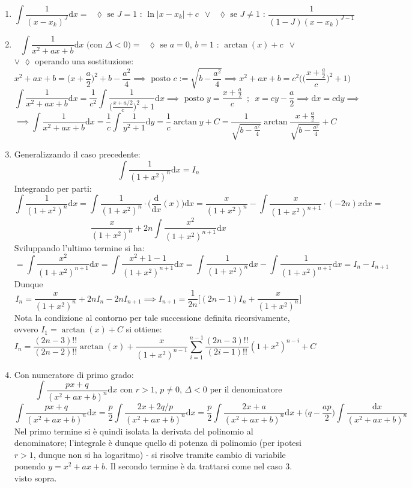 \documentclass[10pt, oneside]{book}
\theoremstyle{plain}
\begin{document}
\begin{enumerate}
    \item \[\int \frac{1}{(x - x_k)^J} \textrm{d}x = \textrm{ $\lozenge$ se $J = 1$ : } \ln|x - x_k| + c \enspace \lor \textrm{ $\lozenge$ se $J \neq 1$ : } \frac{1}{(1 - J) (x - x_k)^{J - 1}}\]
    \item 
    \[\int \frac{1}{x^2 + a x + b} \textrm{d}x \textrm{ (con $\Delta < 0$)} = \textrm{ $\lozenge$ se $a = 0$, $b = 1$ : } \arctan (x) + c \enspace \lor \]
    $\lor$ $\lozenge$ operando una sostituzione:
    \[x^2 + a x + b = \big( x + \frac{a}{2}\big)^2 + b - \frac{a^2}{4} \implies \textrm{ posto } c := \sqrt{b - \frac{a^2}{4}} \implies x^2 + a x + b = c^2 \bigg(\big( \frac{x + \frac{a}{2}}{c}\big)^2 + 1\bigg)\]
    \[\int \frac{1}{x^2 + a x + b} \textrm{d}x = \frac{1}{c^2} \int \frac{1}{\big( \frac{x + a/2}{c}\big)^2 + 1} \textrm{d}x \implies \textrm{ posto } y = \frac{x + \frac{a}{2}}{c} \enspace ; \enspace x = c y - \frac{a}{2} \implies \textrm{d}x = c \textrm{d}y \implies\]
    \[\implies \int \frac{1}{x^2 + a x + b} \textrm{d}x = \frac{1}{c} \int \frac{1}{y^2 + 1} \textrm{d}y = \frac{1}{c} \arctan{y} + C = \frac{1}{\sqrt{b - \frac{a^2}{4}}} \arctan{\frac{x + \frac{a}{2}}{\sqrt{b - \frac{a^2}{4}}}} + C\]
    \item Generalizzando il caso precedente:
    \[\int \frac{1}{(1 + x^2)^n} \textrm{d}x = I_n\]
    Integrando per parti:
    \[\int \frac{1}{(1 + x^2)^n} \textrm{d}x = \int \frac{1}{(1 + x^2)^n} \cdot \big(\frac{\textrm{d}}{\textrm{d}x}(x)\big)\textrm{d}x = \frac{x}{(1 + x^2)^n} - \int \frac{x}{(1 + x^2)^{n+1}}\cdot (-2n) x \textrm{d}x =\]
    \[\frac{x}{(1 + x^2)^n} + 2n \int \frac{x^2}{(1 + x^2)^{n+1}} \textrm{d}x\]
    Sviluppando l'ultimo termine si ha:
    \[= \int \frac{x^2}{(1 + x^2)^{n+1}} \textrm{d}x = \int \frac{x^2 + 1 - 1}{(1 + x^2)^{n+1}} \textrm{d}x = \int \frac{1}{(1 + x^2)^{n}} \textrm{d}x - \int \frac{1}{(1 + x^2)^{n+1}} \textrm{d}x = I_n - I_{n+1}\]
    Dunque 
    \[I_n = \frac{x}{(1+x^2)^n} + 2n I_n - 2n I_{n+1} \implies I_{n+1} = \frac{1}{2n}\bigg[(2n - 1) I_n + \frac{x}{(1+x^2)^n}\bigg]\]
    Nota la condizione al contorno per tale successione definita ricorsivamente, ovvero $I_1 = \arctan (x) + C$ si ottiene:
    \[I_n = \frac{(2n-3)!!}{(2n-2)!!}\arctan(x) + \frac{x}{(1+x^2)^{n-1}}\sum\limits_{i=1}^{n-1} \frac{(2n-3)!!}{(2i-1)!!}(1+x^2)^{n-i} + C\]
    \item Con numeratore di primo grado:
    \[\int \frac{p x + q}{(x^2 + a x + b)^n} \textrm{d}x \textrm{ con $r > 1$, $p \neq 0$, $\Delta < 0$ per il denominatore}\]
    \[\int \frac{p x + q}{(x^2 + a x + b)^n} \textrm{d}x = \frac{p}{2} \int \frac{2 x + 2q\big/p}{(x^2 + a x + b)^n} \textrm{d}x = \frac{p}{2} \int \frac{2 x + a}{(x^2 + a x + b)^n} \textrm{d}x + \big(q - \frac{ap}{2}\big) \int \frac{\textrm{d}x}{(x^2 + a x + b)^n}\]
    Nel primo termine si è quindi isolata la derivata del polinomio al denominatore; l'integrale è dunque quello di potenza di polinomio (per ipotesi $r > 1$, dunque non si ha logaritmo) - si risolve tramite cambio di variabile ponendo $y = x^2 + a x + b$. Il secondo termine è da trattarsi come nel caso 3. visto sopra.
\end{enumerate}
\end{document}
